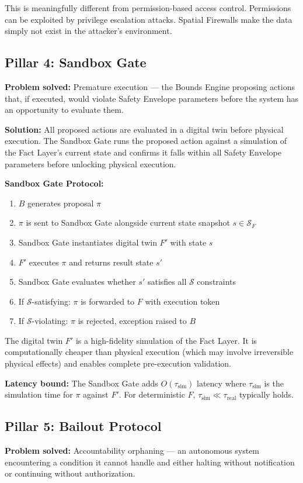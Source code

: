 \documentclass[12pt]{article}
\begin{document}
This is meaningfully different from permission-based access control. Permissions can be exploited by privilege escalation attacks. Spatial Firewalls make the data simply not exist in the attacker's environment.

\subsection{Pillar 4: Sandbox Gate}
\textbf{Problem solved:} Premature execution --- the Bounds Engine proposing actions that, if executed, would violate Safety Envelope parameters before the system has an opportunity to evaluate them.

\textbf{Solution:} All proposed actions are evaluated in a digital twin before physical execution. The Sandbox Gate runs the proposed action against a simulation of the Fact Layer's current state and confirms it falls within all Safety Envelope parameters before unlocking physical execution.

\textbf{Sandbox Gate Protocol:}
\begin{enumerate}
\item $B$ generates proposal $\pi$
\item $\pi$ is sent to Sandbox Gate alongside current state snapshot $s \in \mathcal{S}_F$
\item Sandbox Gate instantiates digital twin $F'$ with state $s$
\item $F'$ executes $\pi$ and returns result state $s'$
\item Sandbox Gate evaluates whether $s'$ satisfies all $\mathcal{S}$ constraints
\item If $\mathcal{S}$-satisfying: $\pi$ is forwarded to $F$ with execution token
\item If $\mathcal{S}$-violating: $\pi$ is rejected, exception raised to $B$
\end{enumerate}

The digital twin $F'$ is a high-fidelity simulation of the Fact Layer. It is computationally cheaper than physical execution (which may involve irreversible physical effects) and enables complete pre-execution validation.

\textbf{Latency bound:} The Sandbox Gate adds $O(\tau_{\text{sim}})$ latency where $\tau_{\text{sim}}$ is the simulation time for $\pi$ against $F'$. For deterministic $F$, $\tau_{\text{sim}} \ll \tau_{\text{real}}$ typically holds.

\subsection{Pillar 5: Bailout Protocol}
\textbf{Problem solved:} Accountability orphaning --- an autonomous system encountering a condition it cannot handle and either halting without notification or continuing without authorization.
\end{document}

